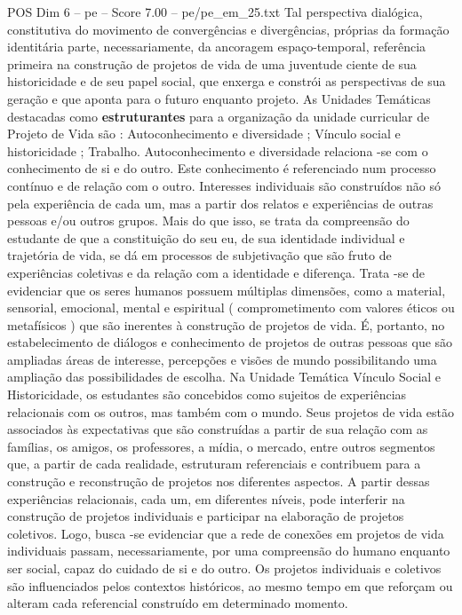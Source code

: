 \begin{textsample}{POS Dim 6 – pe – Score 7.00 – pe/pe\_em\_25.txt}
Tal perspectiva dialógica, constitutiva do movimento de convergências e divergências, próprias da formação identitária parte, necessariamente, da ancoragem espaço-temporal, referência primeira na construção de projetos de vida de uma juventude ciente de sua historicidade e de seu papel social, que enxerga e constrói as perspectivas de sua geração e que aponta para o futuro enquanto projeto.
As Unidades Temáticas destacadas como \textbf{estruturantes} para a organização da unidade curricular de Projeto de Vida são : Autoconhecimento e diversidade ; Vínculo social e historicidade ; Trabalho.
Autoconhecimento e diversidade relaciona -se com o conhecimento de si e do outro.
Este conhecimento é referenciado num processo contínuo e de relação com o outro.
Interesses individuais são construídos não só pela experiência de cada um, mas a partir dos relatos e experiências de outras pessoas e/ou outros grupos.
Mais do que isso, se trata da compreensão do estudante de que a constituição do seu eu, de sua identidade individual e trajetória de vida, se dá em processos de subjetivação que são fruto de experiências coletivas e da relação com a identidade e diferença.
Trata -se de evidenciar que os seres humanos possuem múltiplas dimensões, como a material, sensorial, emocional, mental e espiritual ( comprometimento com valores éticos ou metafísicos ) que são inerentes à construção de projetos de vida.
É, portanto, no estabelecimento de diálogos e conhecimento de projetos de outras pessoas que são ampliadas áreas de interesse, percepções e visões de mundo possibilitando uma ampliação das possibilidades de escolha.
Na Unidade Temática Vínculo Social e Historicidade, os estudantes são concebidos como sujeitos de experiências relacionais com os outros, mas também com o mundo.
Seus projetos de vida estão associados às expectativas que são construídas a partir de sua relação com as famílias, os amigos, os professores, a mídia, o mercado, entre outros segmentos que, a partir de cada realidade, estruturam referenciais e contribuem para a construção e reconstrução de projetos nos diferentes aspectos.
A partir dessas experiências relacionais, cada um, em diferentes níveis, pode interferir na construção de projetos individuais e participar na elaboração de projetos coletivos.
Logo, busca -se evidenciar que a rede de conexões em projetos de vida individuais passam, necessariamente, por uma compreensão do humano enquanto ser social, capaz do cuidado de si e do outro.
Os projetos individuais e coletivos são influenciados pelos contextos históricos, ao mesmo tempo em que reforçam ou alteram cada referencial construído em determinado momento.

\end{textsample}
